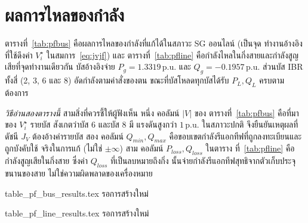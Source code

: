 \documentclass[12pt,a4paper]{article}
\newcommand{\pu}{\,\mathrm{p.u.}}
\begin{document}
\section{ผลการไหลของกำลัง}\label{sec:pf}
ตารางที่~\ref{tab:pfbus} คือผลการไหลของกำลังที่แก้ได้ในสภาวะ SG ออนไลน์ (เป็นจุด
ทำงานอ้างอิงที่ใช้ดึงค่า $V_i^{\star}$ ในสมการ~\eqref{eq:jvjf}) และ
ตารางที่~\ref{tab:pfline} คือกำลังไหลในกิ่งสายและกำลังสูญเสียที่จุดทำงานเดียวกัน
บัสอ้างอิงจ่าย $P_g=1.3319\pu$ และ $Q_g=-0.1957\pu$ ส่วนบัส IBR ทั้งสี่ (2, 3, 6
และ 8) อัดกำลังตามค่าสั่งของตน ขณะที่บัสโหลดทุกบัสได้รับ $P_L,Q_L$ ครบตามต้องการ

\emph{วิธีอ่านสองตารางนี้} สามสิ่งที่ควรชี้ให้ผู้ฟังเห็น หนึ่ง คอลัมน์ $|V|$ ของ
ตารางที่~\ref{tab:pfbus} คือที่มาของ $V_i^{\star}$ รายบัส สังเกตว่าบัส 6 และบัส 8 มี
แรงดันสูงกว่า $1\pu$ ในสภาวะปกติ จึงยืนยันเหตุผลที่ดัชนี $J_V$ ต้องอ้างค่ารายบัส
สอง คอลัมน์ $Q_{min},Q_{max}$ คือขอบเขตกำลังรีแอกทีฟที่ถูกลงทะเบียนและถูกบังคับใช้
จริงในการแก้ (ไม่ใช่ $\pm\infty$) สาม คอลัมน์ $P_{loss},Q_{loss}$ ในตาราง
ที่~\ref{tab:pfline} คือกำลังสูญเสียในกิ่งสาย ซึ่งค่า $Q_{loss}$ ที่เป็นลบหมายถึงกิ่ง
นั้นจ่ายกำลังรีแอกทีฟสุทธิจากตัวเก็บประจุขนานของสาย ไม่ใช่ความผิดพลาดของเครื่องหมาย

\begin{table}[H]
\centering\footnotesize
\caption{ผลการไหลของกำลังรายบัสที่จุดทำงาน SG ออนไลน์ (ค่าต่อหน่วยบนฐานระบบ
มุมเป็นองศา)}
\label{tab:pfbus}
 {}
 {\centering\ttfamily table\_pf\_bus\_results.tex รอการสร้างใหม่}
\end{table}

\begin{table}[H]
\centering\footnotesize
\caption{กำลังไหลในกิ่งสายและกำลังสูญเสียที่จุดทำงาน SG ออนไลน์}
\label{tab:pfline}
 {}
 {\centering\ttfamily table\_pf\_line\_results.tex รอการสร้างใหม่}
\end{table}

\end{document}
